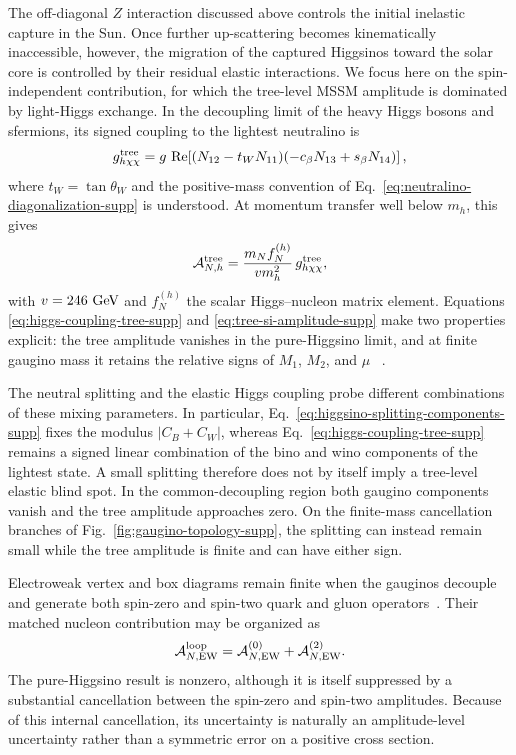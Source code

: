 \documentclass[%
  aps,
  prl,
  reprint,
  superscriptaddress,
  amsmath,
  amssymb,
  longbibliography
]{revtex4-2}
\begin{document}
{The off-diagonal \(Z\) interaction discussed above controls the initial
inelastic capture in the Sun.  Once further up-scattering becomes
kinematically inaccessible, however, the migration of the captured
Higgsinos toward the solar core is controlled by their residual elastic
interactions.  We focus here on the spin-independent contribution, for
which the tree-level MSSM amplitude is dominated by light-Higgs exchange.
In the decoupling limit of the heavy Higgs bosons and sfermions, its signed
coupling to the lightest neutralino is
\begin{equation}
 g_{h\chi\chi}^{\rm tree}
 =g\,\operatorname{Re}\!\left[
 (N_{12}-t_WN_{11})
 (-c_\beta N_{13}+s_\beta N_{14})
 \right] ,
 \label{eq:higgs-coupling-tree-supp}
\end{equation}
where \(t_W=\tan\theta_W\) and the positive-mass convention of
Eq.~\eqref{eq:neutralino-diagonalization-supp} is understood.  At momentum
transfer well below \(m_h\), this gives
\begin{equation}
 \mathcal A_{N,h}^{\rm tree}
 =\frac{m_N f_N^{(h)}}{v m_h^2}\,
 g_{h\chi\chi}^{\rm tree},
 \label{eq:tree-si-amplitude-supp}
\end{equation}
with \(v=246~{\rm GeV}\) and \(f_N^{(h)}\) the scalar Higgs--nucleon matrix
element.  Equations
\eqref{eq:higgs-coupling-tree-supp} and
\eqref{eq:tree-si-amplitude-supp} make two properties explicit: the tree
amplitude vanishes in the pure-Higgsino limit, and at finite gaugino mass it
retains the relative signs of \(M_1\), \(M_2\), and \(\mu\)
~\cite{Hisano:2004pv}.

The neutral splitting and the elastic Higgs coupling probe different
combinations of these mixing parameters.  In particular,
Eq.~\eqref{eq:higgsino-splitting-components-supp} fixes the modulus
\(\lvert C_B+C_W\rvert\), whereas
Eq.~\eqref{eq:higgs-coupling-tree-supp} remains a signed linear combination
of the bino and wino components of the lightest state.  A small splitting
therefore does not by itself imply a tree-level elastic blind spot.  In the
common-decoupling region both gaugino components vanish and the tree
amplitude approaches zero.  On the finite-mass cancellation branches of
Fig.~\ref{fig:gaugino-topology-supp}, the splitting can instead remain small
while the tree amplitude is finite and can have either sign.

Electroweak vertex and box diagrams remain finite when the gauginos
decouple and generate both spin-zero and spin-two quark and gluon
operators~\cite{Hisano:2004pv,Chen:2019gtm}.  Their matched nucleon
contribution may be organized as
\begin{equation}
 \mathcal A_{N,\rm EW}^{\rm loop}
 =\mathcal A_{N,\rm EW}^{(0)}
 +\mathcal A_{N,\rm EW}^{(2)} .
 \label{eq:loop-si-amplitude-supp}
\end{equation}
The pure-Higgsino result is nonzero, although it is itself suppressed by a
substantial cancellation between the spin-zero and spin-two amplitudes.
Because of this internal cancellation, its uncertainty is naturally an
amplitude-level uncertainty rather than a symmetric error on a positive
cross section.

}
\end{document}
